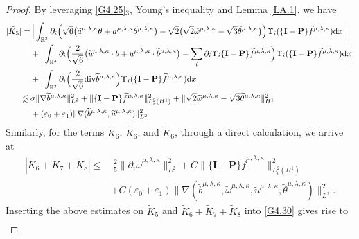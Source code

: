 \documentclass[reqno,11pt]{amsart}
\theoremstyle{plain}
\numberwithin{equation}{section}
\newcommand{\eps}{{\varepsilon}}
\begin{document}
\begin{proof}
By leveraging \eqref{G4.25}$_3$, Young's inequality and Lemma \ref{LA.1}, we have
\begin{align*}
| \widetilde{K}_5|= &\,\Big| \int_{\mathbb{R}^3} \partial_i  \Big(\sqrt{6}\big( \widetilde{a}^{\mu,\lambda,\kappa} \theta+a^{\mu,\lambda,\kappa}\widetilde{\theta}^{\mu,\lambda,\kappa}\big)-\sqrt{2}\big(\sqrt{2} \widetilde\omega^{\mu,\lambda,\kappa}-\sqrt{3} \widetilde\theta^{\mu,\lambda,\kappa}\big) \Big)\Upsilon_i(\{\mathbf{I}-\mathbf{P}\} \widetilde{f}^{\mu,\lambda,\kappa}) \mathrm{d} x\Big| \\
&   +\Big|\int_{\mathbb{R}^3}\partial_i  \Big(\frac{2}{\sqrt{6}}\big( \widetilde{u}^{\mu,\lambda,\kappa} \cdot b+u^{\mu,\lambda,\kappa}\cdot\widetilde{b}^{\mu,\lambda,\kappa}\big)-\sum_i \partial_i \Upsilon_i\{\mathbf{I}-\mathbf{P}\} \widetilde{f}^{\mu,\lambda,\kappa}\Big)    \Upsilon_i(\{\mathbf{I}-\mathbf{P}\} \widetilde{f}^{\mu,\lambda,\kappa}) \mathrm{d} x\Big| \\
&+\Big| \int_{\mathbb{R}^3} \partial_i  \Big( \frac{2}{\sqrt{6}} {\rm div} \widetilde{b}^{\mu,\lambda,\kappa}\Big)\Upsilon_i(\{\mathbf{I}-\mathbf{P}\} \widetilde{f}^{\mu,\lambda,\kappa}) \mathrm{d} x\Big| \\
\lesssim \,& \sigma\|\nabla  \widetilde{b}^{\mu,\lambda,\kappa}\|_{L^2}^2+ \|\{\mathbf{I}-\mathbf{P}\} \widetilde{f}^{\mu,\lambda,\kappa}\|_{L_v^2 (H^1)}^2+ \|\sqrt{2} \widetilde\omega^{\mu,\lambda,\kappa}-\sqrt{3} \widetilde\theta^{\mu,\lambda,\kappa}\|_{H^1}^2\nonumber\\
&+(\eps_0+\eps_1)\|\nabla(\widetilde{b}^{\mu,\lambda,\kappa},\widetilde{u}^{\mu,\lambda,\kappa})\|_{L^2}^2.
\end{align*}
Similarly, for the terms $\widetilde{K}_6$, $\widetilde{K}_6$, and $\widetilde{K}_6$, through a direct calculation, we arrive at  
\begin{align*}
|\widetilde{K}_6+\widetilde{K}_7+\widetilde{K}_8|\leq&\,
\frac{2}{5} \| \partial_i \widetilde\omega^{\mu,\lambda,\kappa} \|_{L^2}^2+C\|\{\mathbf{I}-\mathbf{P}\} \widetilde{f}^{\mu,\lambda,\kappa}\|_{L_v^2 (H^1)}^2 \nonumber\\ &+C(\eps_0+\eps_1)\|\nabla(\widetilde{b}^{\mu,\lambda,\kappa},\widetilde{\omega}^{\mu,\lambda,\kappa},\widetilde{u}^{\mu,\lambda,\kappa},\widetilde\theta^{\mu,\lambda,\kappa})\|_{L^2}^2.   
\end{align*}
Inserting the above estimates on $\widetilde{K}_5$ and $\widetilde{K}_6+\widetilde{K}_7+\widetilde{K}_8$ into
\eqref{G4.30} gives rise to
\begin{align}\label{G4.31}

\end{align}
\end{proof}
\end{document}
